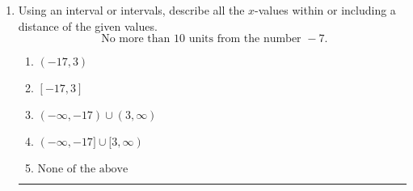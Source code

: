 \documentclass[14pt]{extbook}
\newcommand{\litem}[1]{\item#1\hspace*{-1cm}\rule{\textwidth}{0.4pt}}
\begin{document}
\begin{enumerate}
{\begin{enumerate}[label=\Alph*.]
\end{enumerate} }
\litem{
Using an interval or intervals, describe all the $x$-values within or including a distance of the given values.\[ \text{ No more than } 10 \text{ units from the number } -7. \]\begin{enumerate}[label=\Alph*.]
\item \( (-17, 3) \)
\item \( [-17, 3] \)
\item \( (-\infty, -17) \cup (3, \infty) \)
\item \( (-\infty, -17] \cup [3, \infty) \)
\item \( \text{None of the above} \)

\end{enumerate} }
\end{enumerate}
\end{document}
